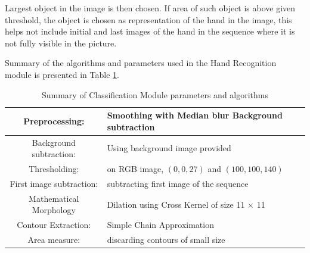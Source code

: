 Largest object in the image is then chosen. If area of such object is above given threshold, the object is chosen as representation of the hand in the image, this helps not include initial and last images of the hand in the sequence where it is not fully visible in the picture.

Summary of the algorithms and parameters used in the Hand Recognition module is presented in Table \ref{tbl:recognition}.

\begin{table}
\begin{tabular}{|c|l|}
\hline 
Preprocessing: & Smoothing with Median blur  Background subtraction\\ 
\hline 
Background subtraction: & Using background image provided\\ 
\hline
Thresholding: & on RGB image, $(0, 0, 27)$ and $(100, 100, 140)$\\ 
\hline
First image subtraction: & subtracting first image of the sequence\\ 
\hline
Mathematical Morphology & Dilation using Cross Kernel of size 11 $\times$ 11 \\ 
\hline 
Contour Extraction: & Simple Chain Approximation \\ 
\hline 
Area measure: & discarding contours of small size \\
\hline 
\end{tabular} 
\caption{Summary of Classification Module parameters and algorithms}
\label{tbl:recognition}
\end{table}